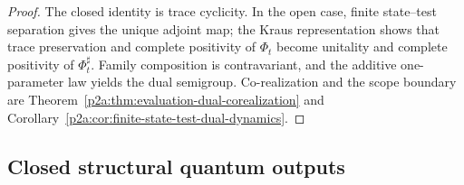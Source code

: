 \documentclass[12pt,a4paper]{article}
\begin{document}
\begin{proof}
The closed identity is trace cyclicity.  In the open case, finite
state--test separation gives the unique adjoint map; the Kraus representation
shows that trace preservation and complete positivity of \(\Phi_t\) become
unitality and complete positivity of \(\Phi_t^\sharp\).  Family composition
is contravariant, and the additive one-parameter law yields the dual
semigroup.  Co-realization and the scope boundary are
Theorem~\ref{p2a:thm:evaluation-dual-corealization} and
Corollary~\ref{p2a:cor:finite-state-test-dual-dynamics}.
\end{proof}



\subsection{Closed structural quantum outputs}
\label{p4:sec:part1-outputs}
\end{document}
